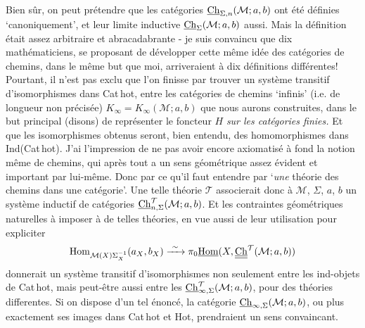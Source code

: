 Bien sûr, on peut prétendre que les catégories $\underline{\mathrm{Ch}}_{\Sigma,n}(\mathcal{M}; a, b)$ ont été définies `canoniquement', et leur limite inductive $\underline{\mathrm{Ch}}_{\Sigma}(\mathcal{M}; a, b)$ aussi. Mais la définition était assez arbitraire et abracadabrante - je suis convaincu que dix mathématiciens, se proposant de développer cette même idée des catégories de chemins, dans le même but que moi, arriveraient à dix définitions différentes! Pourtant, il n'est pas exclu que l'on finisse par trouver un système transitif d'isomorphismes dans Cat\,hot, entre les catégories de chemins `infinis' (i.e. de longueur non précisée) $K_\infty = K_\infty(\mathcal{M}; a, b)$ que nous aurons construites, dans le but
principal (disons) de représenter le foncteur $H$ \textit{sur les catégories finies.} Et que les isomorphismes obtenus seront, bien entendu, des homomorphismes dans Ind(Cat\,hot). J'ai l'impression de ne pas avoir encore axiomatisé à fond la notion même de chemins, qui après tout a un sens géométrique assez évident et important par lui-même. Donc par ce qu'il faut entendre par `\textit{une} théorie des chemins dans une catégorie'. Une telle théorie $\mathcal{T}$ associerait donc à $\mathcal{M}$, $\Sigma$, $a$, $b$ un système inductif de catégories $\underline{\mathrm{Ch}}^{\mathcal{T}}_{n,\Sigma}(\mathcal{M}; a, b)$. Et les contraintes géométriques naturelles à imposer à de telles théories, en vue aussi de leur utilisation pour expliciter
\[
\Hom_{\mathcal{M}(X)\Sigma_X^{-1}}(a_X, b_X) \xrightarrow{\ \sim\ } \pi_0\uHom(X, \Chh^{\mathcal{T}}(\mathcal{M}; a, b)) %
\]
donnerait un système transitif d'isomorphismes non seulement entre les ind-objets de Cat\,hot, mais peut-être aussi entre les $\underline{\mathrm{Ch}}^{\mathcal{T}}_{\infty,\Sigma}(\mathcal{M}; a, b)$, pour des théories differentes. Si on dispose d'un tel énoncé, la catégorie $\underline{\mathrm{Ch}}_{\infty,\Sigma}(\mathcal{M}; a, b)$, ou plus exactement ses images dans Cat\,hot et Hot, %
prendraient un sens convaincant.

